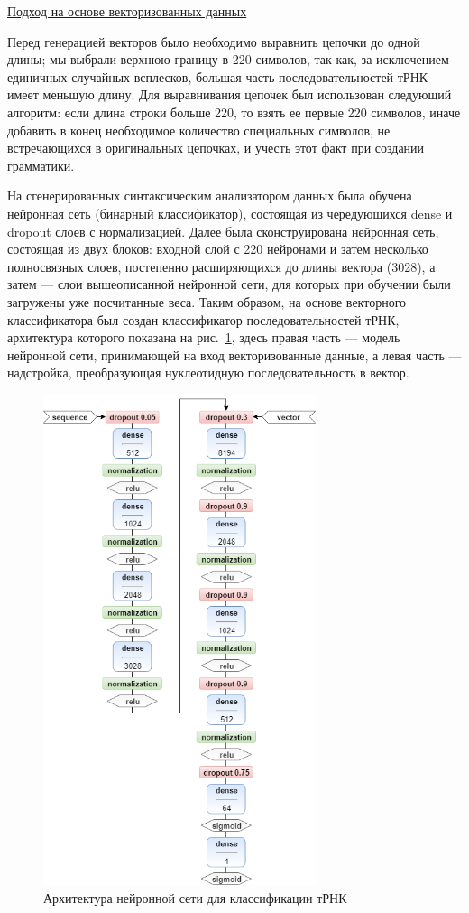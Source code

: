 \documentclass[14pt]{matmex-diploma-custom}
\begin{document}
\vspace{10pt}
\underline{Подход на основе векторизованных данных}

Перед генерацией векторов было необходимо выравнить цепочки до одной длины; мы выбрали верхнюю границу в 220 символов, так как, за исключением единичных случайных всплесков, большая часть последовательностей тРНК имеет меньшую длину. Для выравнивания цепочек был использован следующий алгоритм: если длина строки больше 220, то взять ее первые 220 символов, иначе добавить в конец необходимое количество специальных символов, не встречающихся в оригинальных цепочках, и учесть этот факт при создании грамматики.

На сгенерированных синтаксическим анализатором данных была обучена нейронная сеть (бинарный классификатор), состоящая из чередующихся dense и dropout слоев с нормализацией. Далее была сконструирована нейронная сеть, состоящая из двух блоков: входной слой с 220 нейронами и затем несколько полносвязных слоев, постепенно расширяющихся до длины вектора (3028), а затем --- слои вышеописанной нейронной сети, для которых при обучении были загружены уже посчитанные веса. Таким образом, на основе векторного классификатора был создан классификатор последовательностей тРНК, архитектура которого показана на рис.~\ref{nn1}, здесь правая часть --- модель нейронной сети, принимающей на вход векторизованные данные, а левая часть --- надстройка, преобразующая нуклеотидную последовательность в вектор.

\begin{figure} [h]
\begin{center}
\centering
\includegraphics[width=8cm]{nn.png}
\caption{Архитектура нейронной сети для классификации тРНК}
\label{nn1}
\end{center}
\end{figure}  
\end{document}
